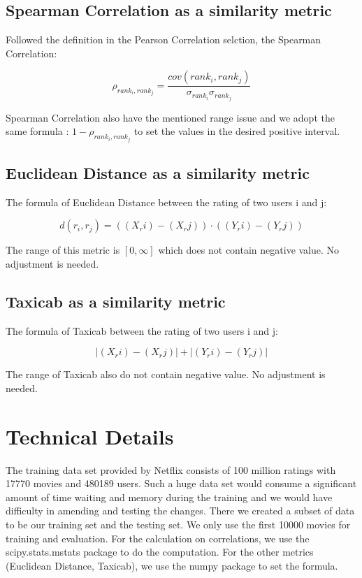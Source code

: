 \documentclass[final]{cvpr}
\begin{document}
\subsection{Spearman Correlation as a similarity metric}

Followed the definition in the Pearson Correlation selction, the Spearman Correlation:

$$ \rho_{{rank}_i,{rank}_j}  = \frac {cov({{rank}_i,{rank}_j})}{\sigma_{rank_i}\sigma_{rank_j}}$$

Spearman Correlation also have the mentioned range issue and we adopt the same formula : $1- \rho_{{rank}_i,{rank}_j}$ to set the values in the desired positive interval.

\subsection{Euclidean Distance as a similarity metric}

The formula of Euclidean Distance between the rating of two users i and j:

$$ d(r_i,r_j) = ((X_ri) - (X_rj)) \cdot ((Y_ri) - (Y_rj)) $$

The range of this metric is $[0,\infty]$ which does not contain negative value. No adjustment is needed.

\subsection{Taxicab as a similarity metric}

The formula of Taxicab between the rating of two users i and j:

$$ |(X_ri) - (X_rj)|+ |(Y_ri) - (Y_rj)| $$

The range of Taxicab also do not contain negative value. No adjustment is needed.

\section{Technical Details}
The training data set provided by Netflix consists of 100 million ratings with 17770 movies and 480189 users. Such a huge data set would consume a significant amount of time waiting and memory during the training and we would have difficulty in amending and testing the changes. There we created a subset of data to be our training set and the testing set. We only use the first 10000 movies for training and evaluation.
For the calculation on correlations, we use the scipy.stats.mstats package to do the computation. For the other metrics (Euclidean Distance, Taxicab), we use the numpy package to set the formula. 
\end{document}
